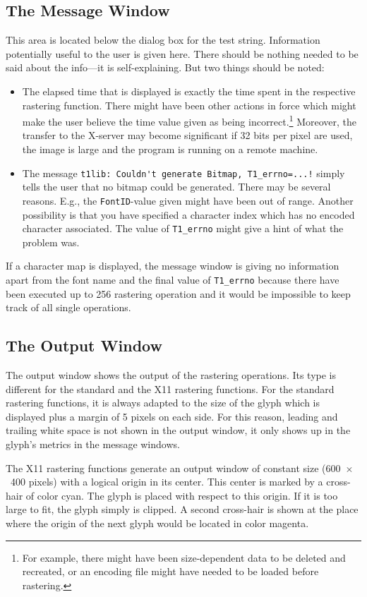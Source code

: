 \subsection{The Message Window}
This area is located below the dialog box for the test
string. Information potentially useful to the user is given here.
There should be nothing needed to be said about the info---it is
self-explaining. 
But two things should be noted:
\begin{itemize}
\item The elapsed time that is displayed is exactly the time spent in
  the respective rastering function. There might
  have been other actions in force which might make the user believe the
  time value given as being incorrect.\footnote{For example, there might have
  been size-dependent data to be deleted and recreated, or an encoding
  file might have needed
  to be loaded before rastering.} Moreover, the transfer to the
  X-server may become significant if 32 bits per pixel are used, the
  image is large and
  the program is running on a remote machine.
\item The message \verb+t1lib: Couldn't generate Bitmap, T1_errno=...!+ simply
  tells the user that no bitmap could be generated. There may be
  several reasons. E.g., the \verb+FontID+-value given might have been
  out of range. Another possibility is that you have specified a
  character index which has no encoded character associated. The value of
  \verb+T1_errno+ might give a hint of what the problem was.
\end{itemize}
If a character map is displayed, the message window is giving no
information apart from the font name and the final value of
\verb+T1_errno+ because there have been executed
up to 256 rastering operation and it would be impossible to keep track
of all single operations.

\subsection{The Output Window}
The output window shows the output of the rastering operations. Its type is
different for the standard and the X11 rastering functions.  For the standard
rastering functions, it is always adapted to the size of the glyph which is
displayed plus a margin of 5 pixels on each side. For this reason, leading and
trailing white space is not shown in the output window, it only shows up in
the glyph's metrics in the message windows. 

The X11 rastering functions
generate an output window of constant size (\hbox{600 $\times $ 400} pixels)
with a logical origin in its center. This center is marked by a cross-hair of
color cyan. The glyph is placed with respect to this origin. If it is too
large to fit, the glyph simply is clipped. A second cross-hair is shown at the
place where the origin of the next glyph would be located in color magenta.

